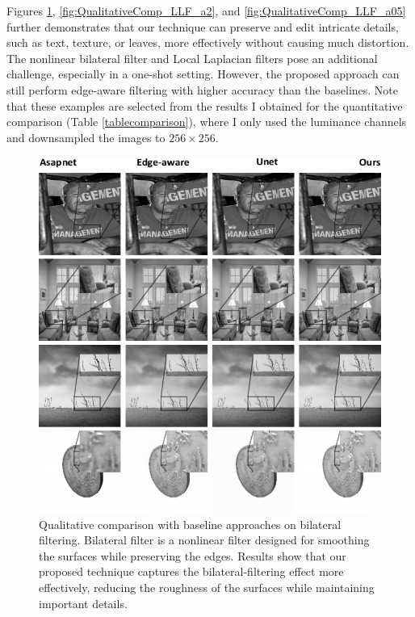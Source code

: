 Figures \ref{fig:QualitativeComp_BF}, \ref{fig:QualitativeComp_LLF_a2}, and \ref{fig:QualitativeComp_LLF_a05} further demonstrates that our technique can preserve and edit intricate details, such as text, texture, or leaves, more effectively without causing much distortion. The nonlinear bilateral filter and Local Laplacian filters pose an additional challenge, especially in a one-shot setting. However, the proposed approach can still perform edge-aware filtering with higher accuracy than the baselines. Note that these examples are selected from the results I obtained for the quantitative comparison (Table \ref{tablecomparison}), where I only used the luminance channels and downsampled the images to $256 \times 256$. 



\begin{figure}%
  \centering
      \includegraphics[width=.82\linewidth]{Chapters/detail-retouching-figs/One-shot-labels.pdf}

  \includegraphics[width=\linewidth]{Chapters/detail-retouching-figs/Qualitative_zoomed_BF.pdf}
    \caption{Qualitative comparison with baseline approaches on bilateral filtering. Bilateral filter is a nonlinear filter designed for smoothing the surfaces while preserving the edges. Results show that our proposed technique captures the bilateral-filtering effect more effectively, reducing the roughness of the surfaces while maintaining important details.} 

   \label{fig:QualitativeComp_BF}%
\end{figure}

